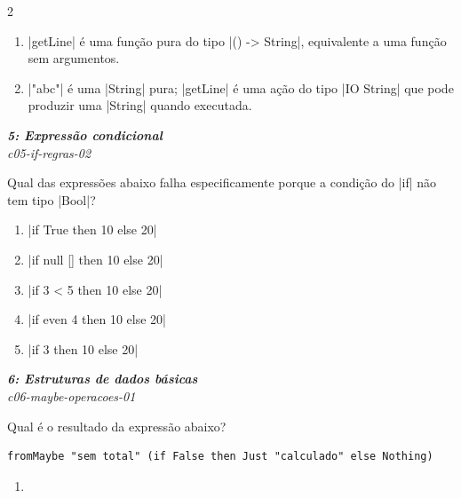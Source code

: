 \documentclass[a4paper,10pt,brazil]{article}
\begin{document}
\begin{multicols}{2}
\begin{enumerate}
  \item \haskellinline|getLine| é uma função pura do tipo \haskellinline|() -> String|, equivalente a uma função sem argumentos.

  \item \haskellinline|"abc"| é uma \haskellinline|String| pura; \haskellinline|getLine| é uma ação do tipo \haskellinline|IO String| que pode produzir uma \haskellinline|String| quando executada.


\end{enumerate}

\begin{flushright}
  \footnotesize
  \textit{\textbf{5: Expressão condicional}}\\
  \textit{c05-if-regras-02}\\

\end{flushright}
Qual das expressões abaixo falha especificamente porque a condição do \haskellinline|if| não tem tipo \haskellinline|Bool|?

\begin{enumerate}
  \item \haskellinline|if True then 10 else 20|

  \item \haskellinline|if null [] then 10 else 20|

  \item \haskellinline|if 3 < 5 then 10 else 20|

  \item \haskellinline|if even 4 then 10 else 20|

  \item \haskellinline|if 3 then 10 else 20|


\end{enumerate}

\begin{flushright}
  \footnotesize
  \textit{\textbf{6: Estruturas de dados básicas}}\\
  \textit{c06-maybe-operacoes-01}\\

\end{flushright}
Qual é o resultado da expressão abaixo?
\begin{verbatim}
fromMaybe "sem total" (if False then Just "calculado" else Nothing)
\end{verbatim}

\begin{enumerate}
  \item {}


\end{enumerate}
\end{multicols}
\end{document}
